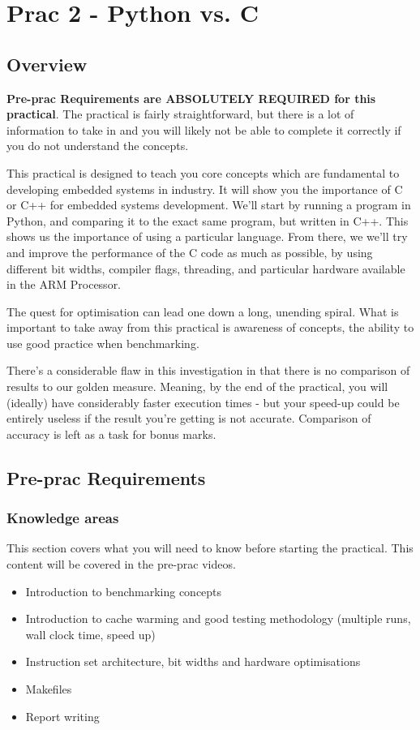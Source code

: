 \newpage
\section{Prac 2 - Python vs. C}
\label{sec:Prac2}

\subsection{Overview}
\textbf{Pre-prac Requirements are ABSOLUTELY REQUIRED for this practical}. The practical is fairly straightforward, but there is a lot of information to take in and you will likely not be able to complete it correctly if you do not understand the concepts.

This practical is designed to teach you core concepts which are fundamental to developing embedded systems in industry. It will show you the importance of C or C++ for embedded systems development. We'll start by running a program in Python, and comparing it to the exact same program, but written in C++. This shows us the importance of using a particular language. From there, we we'll try and improve the performance of the C code as much as possible, by using different bit widths, compiler flags, threading, and particular hardware available in the ARM Processor. 

The quest for optimisation can lead one down a long, unending spiral. What is important to take away from this practical is awareness of concepts, the ability to use good practice when benchmarking.

There's a considerable flaw in this investigation in that there is no comparison of results to our golden measure. Meaning, by the end of the practical, you will (ideally) have considerably faster execution times - but your speed-up could be entirely useless if the result you're getting is not accurate. Comparison of accuracy is left as a task for bonus marks.

\subsection{Pre-prac Requirements}
\subsubsection{Knowledge areas}
This section covers what you will need to know before starting the practical. This content will be covered in the pre-prac videos.
\begin{itemize}
    \item Introduction to benchmarking concepts
    \item Introduction to cache warming and good testing methodology (multiple runs, wall clock time, speed up)
    \item Instruction set architecture, bit widths and hardware optimisations
    \item Makefiles
    \item Report writing
\end{itemize}
